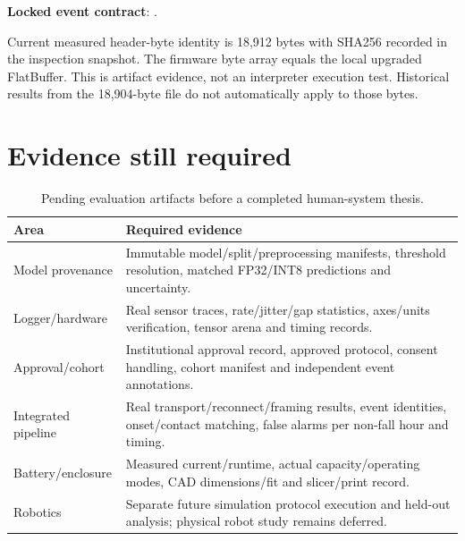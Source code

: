 \textbf{Locked event contract}: .


Current measured header-byte identity is 18,912 bytes with SHA256 recorded in the inspection snapshot. The firmware byte array equals the local upgraded FlatBuffer. This is artifact evidence, not an interpreter execution test. Historical results from the 18,904-byte file do not automatically apply to those bytes.

\clearpage
\section{Evidence still required}
\begin{table}[H]
\centering\caption{Pending evaluation artifacts before a completed human-system thesis.}
\begin{tabular}{@{}p{4cm}p{9.7cm}@{}}\toprule
Area & Required evidence\\\midrule
Model provenance & Immutable model/split/preprocessing manifests, threshold resolution, matched FP32/INT8 predictions and uncertainty.\\
Logger/hardware & Real sensor traces, rate/jitter/gap statistics, axes/units verification, tensor arena and timing records.\\
Approval/cohort & Institutional approval record, approved protocol, consent handling, cohort manifest and independent event annotations.\\
Integrated pipeline & Real transport/reconnect/framing results, event identities, onset/contact matching, false alarms per non-fall hour and timing.\\
Battery/enclosure & Measured current/runtime, actual capacity/operating modes, CAD dimensions/fit and slicer/print record.\\
Robotics & Separate future simulation protocol execution and held-out analysis; physical robot study remains deferred.\\\bottomrule
\end{tabular}
\end{table}
